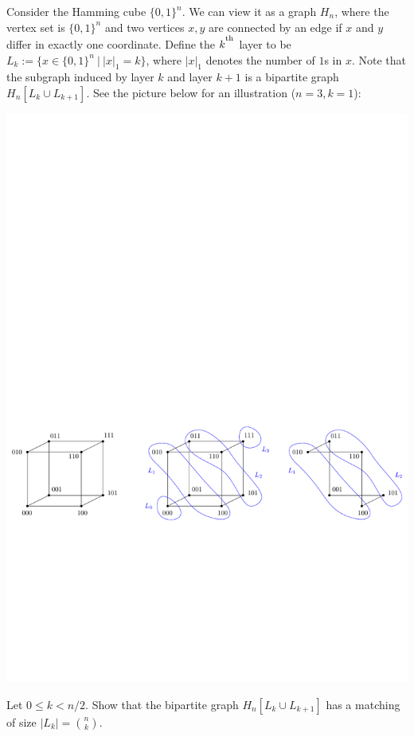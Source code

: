 \documentclass[12pt,a4]{article}
\begin{document}
Consider the Hamming cube $\{0,1\}^n$. We can view it as a graph $H_n$, 
where the vertex set is $\{0,1\}^n$ and two vertices $x,y$ are connected by an 
edge if $x$ and $y$ differ in exactly one coordinate.
Define the $k^{\textsuperscript{th}}$ layer to be 
$L_k := \{ x \in \{0,1\}^n \ | \ |x|_1 = k\}$, where $|x|_1$ denotes the number of $1$s 
in $x$. Note that the subgraph induced by layer $k$ and layer $k+1$ is a bipartite 
graph $H_n [ L_k \cup L_{k+1}]$. See the picture below for an illustration ($n=3, k=1$):
\begin{center}
\includegraphics[width=\textwidth]{figures/hamming-cube-layer-graph.pdf}
\end{center}
\begin{exercise}
 Let $0 \leq k < n/2$.
 Show that the bipartite graph $H_n [L_k \cup L_{k+1}]$ has a matching of size $|L_k| = {n \choose k}$.
\end{exercise}
\end{document}
